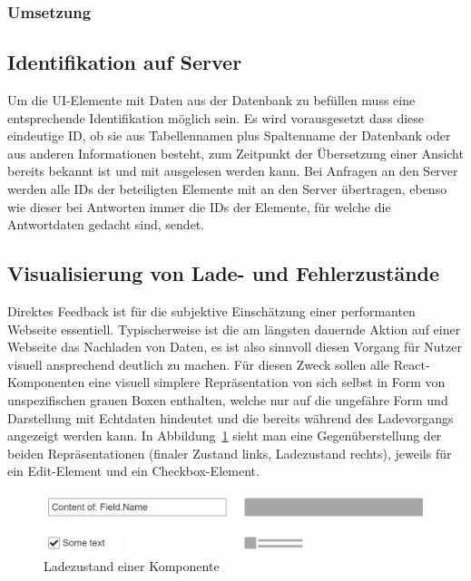 \subsubsection{Umsetzung}\label{subsec:layout}

\subsection{Identifikation auf Server}
Um die UI-Elemente mit Daten aus der Datenbank zu befüllen muss eine entsprechende Identifikation möglich sein. Es wird vorausgesetzt dass diese eindeutige ID, ob sie aus Tabellennamen plus Spaltenname der Datenbank oder aus anderen Informationen besteht, zum Zeitpunkt der Übersetzung einer Ansicht bereits bekannt ist und mit ausgelesen werden kann. Bei Anfragen an den Server werden alle IDs der beteiligten Elemente mit an den Server übertragen, ebenso wie dieser bei Antworten immer die IDs der Elemente, für welche die Antwortdaten gedacht sind, sendet.

\subsection{Visualisierung von Lade- und Fehlerzustände}\label{subsec:loading_state_section}
Direktes Feedback ist für die subjektive Einschätzung einer performanten Webseite essentiell. Typischerweise ist die am längsten dauernde Aktion auf einer Webseite das Nachladen von Daten, es ist also sinnvoll diesen Vorgang für Nutzer visuell ansprechend deutlich zu machen. Für diesen Zweck sollen alle React-Komponenten eine visuell simplere Repräsentation von sich selbst in Form von unspezifischen grauen Boxen enthalten, welche nur auf die ungefähre Form und Darstellung mit Echtdaten hindeutet und die bereits während des Ladevorgangs angezeigt werden kann. In Abbildung~\ref{fig:comp_loading_final_comparison} sieht man eine Gegenüberstellung der beiden Repräsentationen (finaler Zustand links, Ladezustand rechts), jeweils für ein Edit-Element und ein Checkbox-Element.

\begin{figure}
    \centering
    \captionsetup{justification=centering}
    \includegraphics[width=\textwidth]{figures/comp_loading_final_comparison.png}
        \caption{Ladezustand einer Komponente}\label{fig:comp_loading_final_comparison}
\end{figure}

